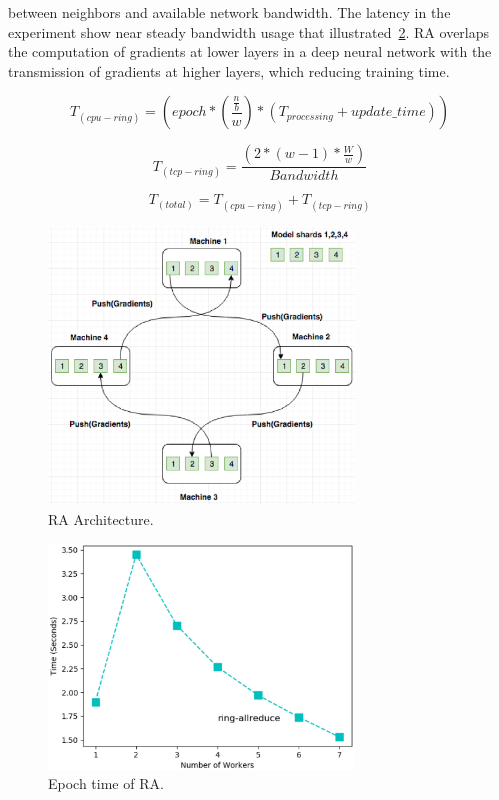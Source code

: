 \documentclass[conference]{IEEEtran}
\begin{document}
between neighbors and available network bandwidth. The latency in the experiment show near steady bandwidth usage that illustrated~\ref{fig:mpilatency}. RA overlaps the computation of gradients at lower layers in a deep neural network with the transmission of gradients at higher layers, which reducing training time.

\begin{equation}
T_{(cpu-ring)} = (epoch* (\frac{\frac{n}{b}}{w}) * (T_{processing}+ update\_time))
\end{equation}

\begin{equation}
T_{(tcp-ring)}  =  \frac{(2*(w-1)*\frac{W}{w})}{Bandwidth}
\end{equation}

\begin{equation}
T_{(total)} = T_{(cpu-ring)} + T_{(tcp-ring)}
\end{equation}

\begin{figure}[htb]
  \includegraphics[width=3.2in]{Fig/ring}
  \caption{RA Architecture.}
  \label{fig:ring}
\end{figure}

\begin{figure}[htb]
  \includegraphics[width=3.2in]{Fig/mpilatency}
  \caption{Epoch time of RA.}
  \label{fig:mpilatency}
\end{figure}
\end{document}

